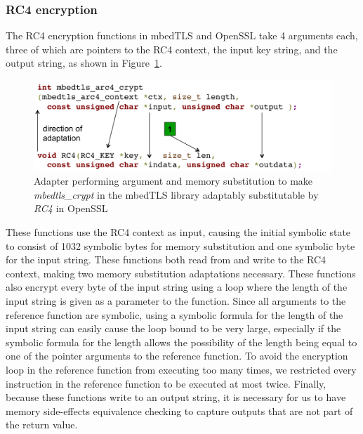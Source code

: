 \subsubsection{RC4 encryption} The RC4 encryption functions in mbedTLS and
OpenSSL take 4 arguments each, three of which are pointers to the RC4
context, the input key string, and the output string, as shown in
Figure~\ref{fig:rc4-encrypt-mo}.
%
\begin{figure}[]
	\centering
	\caption{Adapter performing argument and memory substitution to make
	\textit{mbedtls\_crypt} in the mbedTLS library adaptably substitutable
	by \textit{RC4} in OpenSSL}
	\label{fig:rc4-encrypt-mo}
	\includegraphics[width=\widthfactor\columnwidth]{chapters/adapter_synthesis/figures/rc4-encrypt-mo}
\end{figure}
%
These functions use the RC4 context as input, causing the initial symbolic state to consist of 1032 symbolic bytes for memory substitution and one symbolic byte for the input string.
%
These functions both read from and write to the RC4 context, making
two memory substitution adaptations necessary.
%
These functions also encrypt every byte of the input string using a loop where the length of the input string is given as a parameter to the function.
%
Since all arguments to the reference function are symbolic, using a symbolic formula for the length of the input string can easily cause the loop bound to be very large, especially if the symbolic formula for the length allows the possibility of the length being equal to one of the pointer arguments to the reference function.
%
To avoid the encryption loop in the reference function from executing too many times, we restricted every instruction in the reference function to be executed at most twice.
%
Finally, because these functions write to an output string, it is
necessary for us to have memory side-effects equivalence checking to
capture outputs that are not part of the return value.

